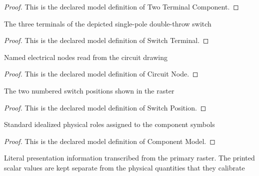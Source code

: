 \begin{proof}
  This is the declared model definition of Two Terminal Component.
\end{proof}
\begin{definition}
  \label{def:physics:phyx-mini-0934:phyxminiproblems-problemphyxmini0934-switchterminal}
  The three terminals of the depicted single-pole double-throw switch
\end{definition}
\begin{proof}
  This is the declared model definition of Switch Terminal.
\end{proof}
\begin{definition}
  \label{def:physics:phyx-mini-0934:phyxminiproblems-problemphyxmini0934-circuitnode}
  Named electrical nodes read from the circuit drawing
\end{definition}
\begin{proof}
  This is the declared model definition of Circuit Node.
\end{proof}
\begin{definition}
  \label{def:physics:phyx-mini-0934:phyxminiproblems-problemphyxmini0934-switchposition}
  The two numbered switch positions shown in the raster
\end{definition}
\begin{proof}
  This is the declared model definition of Switch Position.
\end{proof}
\begin{definition}
  \label{def:physics:phyx-mini-0934:phyxminiproblems-problemphyxmini0934-componentmodel}
  Standard idealized physical roles assigned to the component symbols
\end{definition}
\begin{proof}
  This is the declared model definition of Component Model.
\end{proof}
\begin{definition}
  \label{def:physics:phyx-mini-0934:phyxminiproblems-problemphyxmini0934-switchedlcfigure}
  Literal presentation information transcribed from the primary raster. The printed scalar values are kept separate from the physical quantities that they calibrate
\end{definition}
